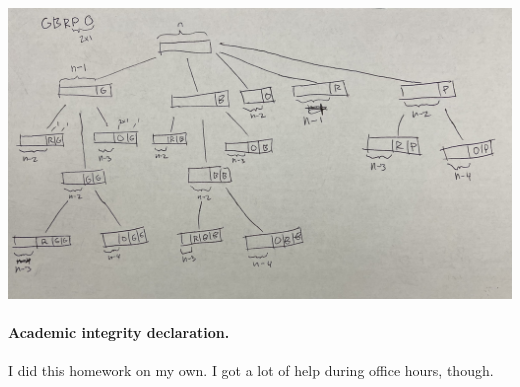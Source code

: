 \documentclass[11pt]{article}
\begin{document}
\begin{solution}
	\\\\\includegraphics[scale=0.05]{q3tree.jpg}
\end{solution}

\newpage
\vskip 0.1in

\paragraph{Academic integrity declaration.}
I did this homework on my own. I got a lot of help during office hours, though.
\end{document}
